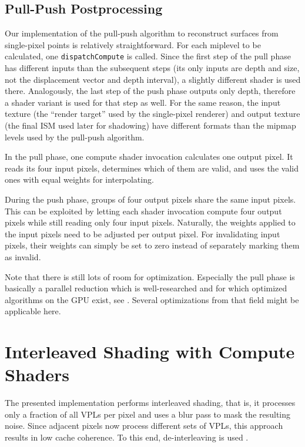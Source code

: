 \subsection{Pull-Push Postprocessing}
\label{sec:impl:pullPushPostprocessing}

Our implementation of the pull-push algorithm to reconstruct surfaces from single-pixel points is relatively straightforward. For each miplevel to be calculated, one \texttt{dispatchCompute} is called. Since the first step of the pull phase has different inputs than the subsequent steps (its only inputs are depth and size, not the displacement vector and depth interval), a slightly different shader is used there. Analogously, the last step of the push phase outputs only depth, therefore a shader variant is used for that step as well. For the same reason, the input texture (the ``render target'' used by the single-pixel renderer) and output texture (the final ISM used later for shadowing) have different formats than the mipmap levels used by the pull-push algorithm.


In the pull phase, one compute shader invocation calculates one output pixel. It reads its four input pixels, determines which of them are valid, and uses the valid ones with equal weights for interpolating.


During the push phase, groups of four output pixels share the same input pixels. This can be exploited by letting each shader invocation compute four output pixels while still reading only four input pixels. Naturally, the weights applied to the input pixels need to be adjusted per output pixel. For invalidating input pixels, their weights can simply be set to zero instead of separately marking them as invalid.

Note that there is still lots of room for optimization. Especially the pull phase is basically a parallel reduction which is well-researched and for which optimized algorithms on the GPU exist, see  \citet{Harris:2007:ParallelReduction}. Several optimizations from that field might be applicable here.



\section{Interleaved Shading with Compute Shaders}
\label{sec:impl:interleavedShading}

The presented implementation performs interleaved shading, that is, it processes only a fraction of all VPLs per pixel and uses a blur pass to mask the resulting noise. Since adjacent pixels now process different sets of VPLs, this approach results in low cache coherence. To this end, de-interleaving is used \citep{segovia2006non}.

